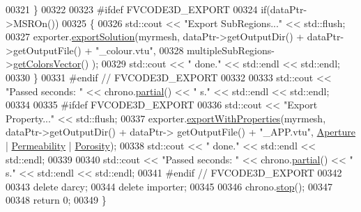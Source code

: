 \begin{DoxyCode}
00321         \}
00322 
00323 \textcolor{preprocessor}{#ifdef FVCODE3D\_EXPORT}
00324     \textcolor{keywordflow}{if}(dataPtr->MSROn())
00325     \{
00326         std::cout << \textcolor{stringliteral}{"Export SubRegions..."} << std::flush;
00327         exporter.\hyperlink{classFVCode3D_1_1ExporterVTU_a476a1dd02bcba8c31f0d99c7106d0c21}{exportSolution}(myrmesh, dataPtr->getOutputDir() + dataPtr->getOutputFile() +
       \textcolor{stringliteral}{"\_colour.vtu"},
00328     multipleSubRegions->\hyperlink{classFVCode3D_1_1MSR_a45eca62b8bdf376a08c668b1535ac275}{getColorsVector}() );
00329         std::cout << \textcolor{stringliteral}{" done."} << std::endl << std::endl;
00330     \}
00331 \textcolor{preprocessor}{#endif // FVCODE3D\_EXPORT}
00332 
00333     std::cout << \textcolor{stringliteral}{"Passed seconds: "} << chrono.\hyperlink{classFVCode3D_1_1Chrono_a245a0c47da85e80de56e85d3689b925b}{partial}() << \textcolor{stringliteral}{" s."} << std::endl << std::endl;
00334 
00335 \textcolor{preprocessor}{#ifdef FVCODE3D\_EXPORT}
00336     std::cout << \textcolor{stringliteral}{"Export Property..."} << std::flush;
00337     exporter.\hyperlink{classFVCode3D_1_1ExporterVTU_a12240c4de9e7b3a5bf8f513c873c4547}{exportWithProperties}(myrmesh, dataPtr->getOutputDir() + dataPtr->
      getOutputFile() + \textcolor{stringliteral}{"\_APP.vtu"}, \hyperlink{namespaceFVCode3D_ab3abc77722284ce4344be90bb61c1a41a7bea6d441c4661b396fc86912312c47e}{Aperture} | \hyperlink{namespaceFVCode3D_ab3abc77722284ce4344be90bb61c1a41a23fa3ea40f896b28978ffc259e5281cf}{Permeability} | \hyperlink{namespaceFVCode3D_ab3abc77722284ce4344be90bb61c1a41a8bb92532e203b2a2b45c4b2ce0354a90}{Porosity});
00338     std::cout << \textcolor{stringliteral}{" done."} << std::endl << std::endl;
00339 
00340     std::cout << \textcolor{stringliteral}{"Passed seconds: "} << chrono.\hyperlink{classFVCode3D_1_1Chrono_a245a0c47da85e80de56e85d3689b925b}{partial}() << \textcolor{stringliteral}{" s."} << std::endl << std::endl;
00341 \textcolor{preprocessor}{#endif // FVCODE3D\_EXPORT}
00342 
00343     \textcolor{keyword}{delete} darcy;
00344     \textcolor{keyword}{delete} importer;
00345 
00346     chrono.\hyperlink{classFVCode3D_1_1Chrono_acc8f31330aa1819b12947866075fbc9e}{stop}();
00347 
00348     \textcolor{keywordflow}{return} 0;
00349 \}
\end{DoxyCode}
